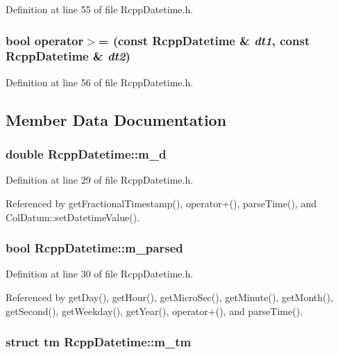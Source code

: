 Definition at line 55 of file RcppDatetime.h.\hypertarget{classRcppDatetime_a1aac48969216af0555677a43b3617781}{
\subsubsection[{operator$>$=}]{\setlength{\rightskip}{0pt plus 5cm}bool operator$>$= (const {\bf RcppDatetime} \& {\em dt1}, \/  const {\bf RcppDatetime} \& {\em dt2})}}
\label{classRcppDatetime_a1aac48969216af0555677a43b3617781}


Definition at line 56 of file RcppDatetime.h.

\subsection{Member Data Documentation}
\hypertarget{classRcppDatetime_a1af187ff381bfa0f5b57d28b64d7b60c}{
\subsubsection[{m\_\-d}]{\setlength{\rightskip}{0pt plus 5cm}double {\bf RcppDatetime::m\_\-d}}}
\label{classRcppDatetime_a1af187ff381bfa0f5b57d28b64d7b60c}


Definition at line 29 of file RcppDatetime.h.

Referenced by getFractionalTimestamp(), operator+(), parseTime(), and ColDatum::setDatetimeValue().\hypertarget{classRcppDatetime_a515e3390c1834e58ce6bba39854638ad}{
\subsubsection[{m\_\-parsed}]{\setlength{\rightskip}{0pt plus 5cm}bool {\bf RcppDatetime::m\_\-parsed}}}
\label{classRcppDatetime_a515e3390c1834e58ce6bba39854638ad}


Definition at line 30 of file RcppDatetime.h.

Referenced by getDay(), getHour(), getMicroSec(), getMinute(), getMonth(), getSecond(), getWeekday(), getYear(), operator+(), and parseTime().\hypertarget{classRcppDatetime_a3f65c708657270208656c1be885e9f1b}{
\subsubsection[{m\_\-tm}]{\setlength{\rightskip}{0pt plus 5cm}struct tm {\bf RcppDatetime::m\_\-tm}}}
\label{classRcppDatetime_a3f65c708657270208656c1be885e9f1b}


